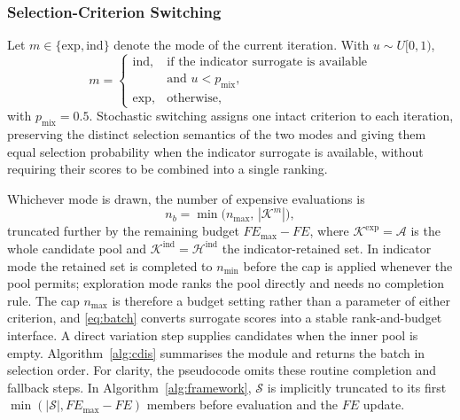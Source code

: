 \documentclass[final,5p,times,twocolumn]{elsarticle}
\begin{document}
\subsubsection{Selection-Criterion Switching}
\label{sec:method:cdis:mix}

Let $m\in\{\mathrm{exp},\mathrm{ind}\}$ denote the mode of the current
iteration. With $u\sim U[0,1)$,
\begin{equation}
m=
\begin{cases}
\mathrm{ind}, & \text{if the indicator surrogate is available}\\
              & \text{and } u<p_{\mathrm{mix}},\\[2pt]
\mathrm{exp}, & \text{otherwise},
\end{cases}
\label{eq:mode}
\end{equation}
with $p_{\mathrm{mix}}=0.5$. Stochastic switching assigns one intact criterion
to each iteration, preserving the distinct selection semantics of the two modes
and giving them equal selection probability when the indicator surrogate is
available, without requiring their scores to be combined into a single ranking.

Whichever mode is drawn, the number of expensive evaluations is
\begin{equation}
n_b=\min\bigl(n_{\max},\,|\mathcal{K}^{m}|\bigr),
\label{eq:batch}
\end{equation}
truncated further by the remaining budget $FE_{\max}-FE$, where
$\mathcal{K}^{\mathrm{exp}}=\mathcal{A}$ is the whole candidate pool and
$\mathcal{K}^{\mathrm{ind}}=\mathcal{H}^{\mathrm{ind}}$ the indicator-retained
set. In indicator mode the retained set is completed to $n_{\min}$ before the
cap is applied whenever the pool permits; exploration mode ranks the pool
directly and needs no completion rule. The cap $n_{\max}$ is therefore a budget
setting rather than a parameter of either criterion, and \eqref{eq:batch}
converts surrogate scores into a stable rank-and-budget interface. A direct variation step supplies candidates
when the inner pool is empty. Algorithm~\ref{alg:cdis} summarises the
module and returns the batch in selection order. For clarity, the pseudocode
omits these routine completion and fallback steps. In
Algorithm~\ref{alg:framework}, $\mathcal{S}$ is implicitly truncated to its first
$\min(|\mathcal{S}|,FE_{\max}-FE)$ members before evaluation and the $FE$ update.
\end{document}

